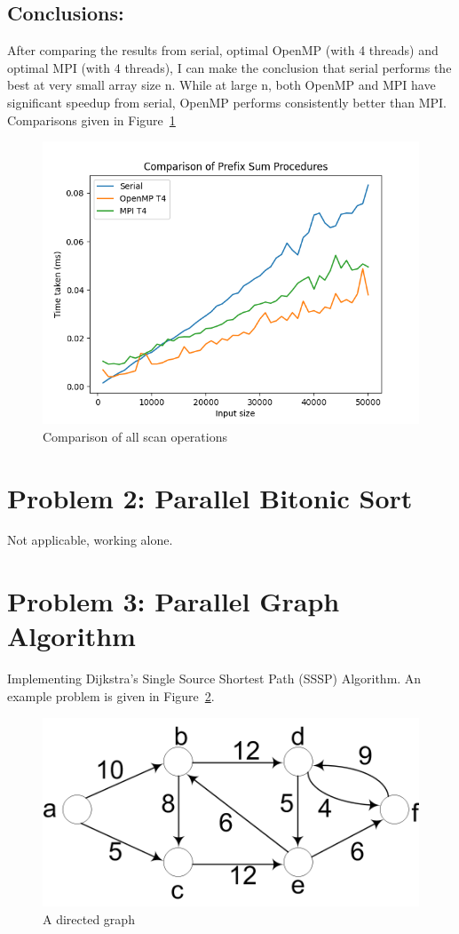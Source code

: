 	\subsection{Conclusions:}
	After comparing the results from serial, optimal OpenMP (with 4 threads) and optimal MPI (with 4 threads), I can make the conclusion that serial performs the best at very small array size n. While at large n, both OpenMP and MPI have significant speedup from serial, OpenMP performs consistently better than MPI.
	Comparisons given in Figure~\ref{fig:fig_scan_comparison}
	\begin{figure}[!htb]
		\centering
		\includegraphics[width=0.6\linewidth]{scan_comparison.png}
		\caption{Comparison of all scan operations}
		\label{fig:fig_scan_comparison}
	\end{figure}

	\section{Problem 2: Parallel Bitonic Sort}
	Not applicable, working alone.
	
	\section{Problem 3: Parallel Graph Algorithm}
	Implementing Dijkstra’s Single Source Shortest Path (SSSP) Algorithm. An example problem is given in Figure~\ref{fig:sp_fig1}.
	\begin{figure}[!htb]
		\centering
		\includegraphics[width=0.3\linewidth]{sp_fig1.png}
		\caption{A directed graph}\label{fig:sp_fig1}
	\end{figure}
	

